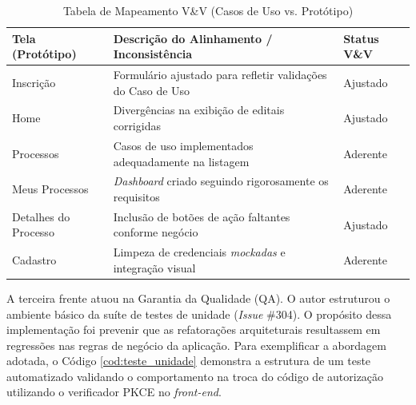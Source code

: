 \begin{table}[H]
    \centering
    \caption{Tabela de Mapeamento V\&V (Casos de Uso vs. Protótipo)}
    \label{tab:mapeamento_vv}
    \begin{tabular}{|l|p{8cm}|l|}
        \hline
        \textbf{Tela (Protótipo)} & \textbf{Descrição do Alinhamento / Inconsistência} & \textbf{Status V\&V} \\ \hline
        Inscrição & Formulário ajustado para refletir validações do Caso de Uso & Ajustado \\ \hline
        Home & Divergências na exibição de editais corrigidas & Ajustado \\ \hline
        Processos & Casos de uso implementados adequadamente na listagem & Aderente \\ \hline
        Meus Processos & \textit{Dashboard} criado seguindo rigorosamente os requisitos & Aderente \\ \hline
        Detalhes do Processo & Inclusão de botões de ação faltantes conforme negócio & Ajustado \\ \hline
        Cadastro & Limpeza de credenciais \textit{mockadas} e integração visual & Aderente \\ \hline
    \end{tabular}
\end{table}

A terceira frente atuou na Garantia da Qualidade (QA). O autor estruturou o ambiente básico da suíte de testes de unidade (\textit{Issue} \#304). O propósito dessa implementação foi prevenir que as refatorações arquiteturais resultassem em regressões nas regras de negócio da aplicação. Para exemplificar a abordagem adotada, o Código \ref{cod:teste_unidade} demonstra a estrutura de um teste automatizado validando o comportamento na troca do código de autorização utilizando o verificador PKCE no \textit{front-end}.

